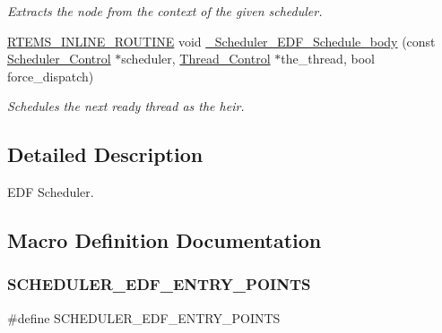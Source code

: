 \begin{DoxyCompactItemize}
\begin{DoxyCompactList}\small\item\em Extracts the node from the context of the given scheduler. \end{DoxyCompactList}\item 
\mbox{\hyperlink{group__RTEMSScoreBaseDefs_gac216239df231d5dbd15e3520b0b9313f}{R\+T\+E\+M\+S\+\_\+\+I\+N\+L\+I\+N\+E\+\_\+\+R\+O\+U\+T\+I\+NE}} void \mbox{\hyperlink{group__RTEMSScoreSchedulerEDF_gacacc0195101c7c177c6bce307de1699a}{\+\_\+\+Scheduler\+\_\+\+E\+D\+F\+\_\+\+Schedule\+\_\+body}} (const \mbox{\hyperlink{struct__Scheduler__Control}{Scheduler\+\_\+\+Control}} $\ast$scheduler, \mbox{\hyperlink{struct__Thread__Control}{Thread\+\_\+\+Control}} $\ast$the\+\_\+thread, bool force\+\_\+dispatch)
\begin{DoxyCompactList}\small\item\em Schedules the next ready thread as the heir. \end{DoxyCompactList}\end{DoxyCompactItemize}


\subsection{Detailed Description}
E\+DF Scheduler. 



\subsection{Macro Definition Documentation}
\mbox{\label{group__RTEMSScoreSchedulerEDF_ga348e7e95a0d6fd2e7c3e657a812a8c18}} 
\subsubsection{\texorpdfstring{SCHEDULER\_EDF\_ENTRY\_POINTS}{SCHEDULER\_EDF\_ENTRY\_POINTS}}
{\footnotesize\ttfamily \#define S\+C\+H\+E\+D\+U\+L\+E\+R\+\_\+\+E\+D\+F\+\_\+\+E\+N\+T\+R\+Y\+\_\+\+P\+O\+I\+N\+TS}


